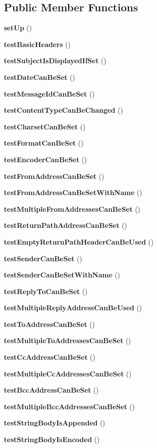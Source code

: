 \subsection*{Public Member Functions}
\begin{DoxyCompactItemize}
\item 
{\bf set\+Up} ()
\item 
{\bf test\+Basic\+Headers} ()
\item 
{\bf test\+Subject\+Is\+Displayed\+If\+Set} ()
\item 
{\bf test\+Date\+Can\+Be\+Set} ()
\item 
{\bf test\+Message\+Id\+Can\+Be\+Set} ()
\item 
{\bf test\+Content\+Type\+Can\+Be\+Changed} ()
\item 
{\bf test\+Charset\+Can\+Be\+Set} ()
\item 
{\bf test\+Format\+Can\+Be\+Set} ()
\item 
{\bf test\+Encoder\+Can\+Be\+Set} ()
\item 
{\bf test\+From\+Address\+Can\+Be\+Set} ()
\item 
{\bf test\+From\+Address\+Can\+Be\+Set\+With\+Name} ()
\item 
{\bf test\+Multiple\+From\+Addresses\+Can\+Be\+Set} ()
\item 
{\bf test\+Return\+Path\+Address\+Can\+Be\+Set} ()
\item 
{\bf test\+Empty\+Return\+Path\+Header\+Can\+Be\+Used} ()
\item 
{\bf test\+Sender\+Can\+Be\+Set} ()
\item 
{\bf test\+Sender\+Can\+Be\+Set\+With\+Name} ()
\item 
{\bf test\+Reply\+To\+Can\+Be\+Set} ()
\item 
{\bf test\+Multiple\+Reply\+Address\+Can\+Be\+Used} ()
\item 
{\bf test\+To\+Address\+Can\+Be\+Set} ()
\item 
{\bf test\+Multiple\+To\+Addresses\+Can\+Be\+Set} ()
\item 
{\bf test\+Cc\+Address\+Can\+Be\+Set} ()
\item 
{\bf test\+Multiple\+Cc\+Addresses\+Can\+Be\+Set} ()
\item 
{\bf test\+Bcc\+Address\+Can\+Be\+Set} ()
\item 
{\bf test\+Multiple\+Bcc\+Addresses\+Can\+Be\+Set} ()
\item 
{\bf test\+String\+Body\+Is\+Appended} ()
\item 
{\bf test\+String\+Body\+Is\+Encoded} ()

\end{DoxyCompactItemize}
